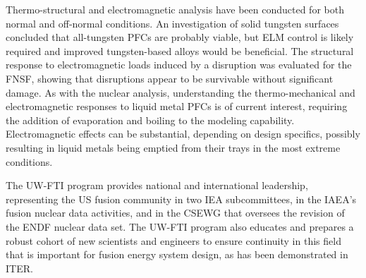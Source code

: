 Thermo-structural and electromagnetic analysis have been conducted for both
normal and off-normal conditions.  An investigation of solid tungsten surfaces
concluded that all-tungsten \glspl{PFC} are probably viable, but ELM control
is likely required and improved tungsten-based alloys would be beneficial.
The structural response to electromagnetic loads induced by a disruption was
evaluated for the \gls{FNSF}, showing that disruptions appear to be survivable
without significant damage.  As with the nuclear analysis, understanding the
thermo-mechanical and electromagnetic responses to liquid metal \glspl{PFC} is
of current interest, requiring the addition of evaporation and boiling to the
modeling capability.  Electromagnetic effects can be substantial, depending on
design specifics, possibly resulting in liquid metals being emptied from their
trays in the most extreme conditions.

The \gls{UW-FTI} program provides national and international leadership,
representing the US fusion community in two IEA subcommittees, in the IAEA's
fusion nuclear data activities, and in the \gls{CSEWG} that oversees the
revision of the ENDF nuclear data set.  The \gls{UW-FTI} program also educates
and prepares a robust cohort of new scientists and engineers to ensure
continuity in this field that is important for fusion energy system design, as
has been demonstrated in ITER.
